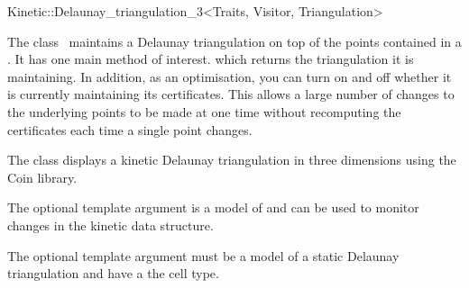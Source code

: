 

\begin{ccRefClass}{Kinetic::Delaunay_triangulation_3<Traits, Visitor, Triangulation>}  %


\ccDefinition
  
The class \ccRefName\ maintains a Delaunay triangulation on top of the
points contained in a . It has one main method
of interest.  which returns the triangulation it
is maintaining. In addition, as an optimisation, you can turn on and
off whether it is currently maintaining its certificates. This allows
a large number of changes to the underlying points to be made at one
time without recomputing the certificates each time a single point
changes.

The class  displays a kinetic
Delaunay triangulation in three dimensions using the Coin library.

The optional  template argument is a model of
 and can be used to monitor
changes in the kinetic data structure.

The optional  template argument must be a model of
a static Delaunay triangulation and have
 a the cell
type.



\ccTypes




\end{ccRefClass}
